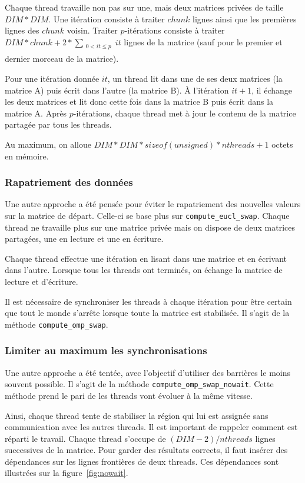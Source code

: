 Chaque thread travaille non pas sur une, mais deux matrices privées de
taille $DIM*DIM$. Une itération consiste à traiter $chunk$ lignes
ainsi que les premières lignes des $chunk$ voisin. Traiter
$p$-itérations consiste à traiter
$DIM*chunk+2*\sum_{\substack{0<it\leq p \\}}it$ lignes de la matrice
(sauf pour le premier et dernier morceau de la matrice).

Pour une itération donnée $it$, un thread lit dans
une de ses deux matrices (la matrice A) puis écrit dans l'autre (la
matrice B). À l'itération $it+1$, il échange les deux matrices et lit
donc cette fois dans la matrice B puis écrit dans la matrice A. Après
$p$-itérations, chaque thread met à jour le contenu de la matrice
partagée par tous les threads.

Au maximum, on alloue $DIM*DIM*sizeof(unsigned)*nthreads+1$ octets en
mémoire.


\subsubsection{Rapatriement des données}

Une autre approche a été pensée pour éviter le rapatriement des
nouvelles valeurs sur la matrice de départ. Celle-ci se base plus
sur \texttt{compute\_eucl\_swap}. Chaque thread ne travaille plus sur
une matrice privée mais on dispose de deux matrices partagées, une en
lecture et une en écriture.

Chaque thread effectue une itération en lisant dans une matrice et en
écrivant dans l'autre. Lorsque tous les threads ont terminés, on
échange la matrice de lecture et d'écriture.

Il est nécessaire de synchroniser les threads à chaque itération pour
être certain que tout le monde s'arrête lorsque toute la matrice est
stabilisée. Il s'agit de la méthode \texttt{compute\_omp\_swap}.
\medskip

\subsubsection{Limiter au maximum les synchronisations}

Une autre approche a été tentée, avec l'objectif d'utiliser des
barrières le moins souvent possible. Il s'agit de la méthode
\texttt{compute\_omp\_swap\_nowait}. Cette méthode prend
le pari de les threads vont évoluer à la même vitesse.
\medskip

Ainsi, chaque thread tente de stabiliser la région qui lui est
assignée sans communication avec les autres threads. Il est important
de rappeler comment est réparti le travail. Chaque thread s'occupe de
$(DIM-2)/nthreads$ lignes successives de la matrice. Pour garder des
résultats corrects, il faut insérer des dépendances sur les lignes
frontières de deux threads. Ces dépendances sont illustrées sur la
figure~\ref{fig:nowait}.
\medskip

